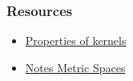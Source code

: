 \documentclass{beamer}
\begin{document}
    \begin{frame}
        \frametitle{Resources}
        \begin{itemize}
            \item \href{https://people.eecs.berkeley.edu/~jordan/kernels/0521813972c03_p47-84.pdf}{Properties of kernels}
            \item \href{https://www.cs.mcgill.ca/~prakash/Courses/599/Notes/metric_spaces.pdf}{Notes Metric Spaces} \\
        \end{itemize}
    \end{frame}
\end{document}
